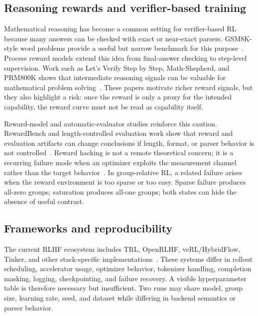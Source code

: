 \documentclass[runningheads,a4paper]{llncs}
\begin{document}
\subsection{Reasoning rewards and verifier-based training}

Mathematical reasoning has become a common setting for verifier-based RL
because many answers can be checked with exact or near-exact parsers.
GSM8K-style word problems provide a useful but narrow benchmark for this
purpose~\cite{cobbe2021training}. Process reward models extend this idea from
final-answer checking to step-level supervision. Work such as Let's Verify
Step by Step, Math-Shepherd, and PRM800K shows that intermediate reasoning
signals can be valuable for mathematical problem solving~\cite{lightman2024stepbystep,wang2024mathshepherd,uesato2022prm800k}. These papers motivate richer reward
signals, but they also highlight a risk: once the reward is only a proxy for
the intended capability, the reward curve must not be read as capability
itself.

Reward-model and automatic-evaluator studies reinforce this caution.
RewardBench and length-controlled evaluation work show that reward and
evaluation artifacts can change conclusions if length, format, or parser
behavior is not controlled~\cite{lambert2024rewardbench,dubois2024lengthcontrolled}.
Reward hacking is not a remote theoretical concern; it is a recurring failure
mode when an optimizer exploits the measurement channel rather than the target
behavior~\cite{skalse2022specificationgaming}. In group-relative RL, a related
failure arises when the reward environment is too sparse or too easy. Sparse
failure produces all-zero groups; saturation produces all-one groups; both
states can hide the absence of useful contrast.

\subsection{Frameworks and reproducibility}

The current RLHF ecosystem includes TRL, OpenRLHF, veRL/HybridFlow, Tinker, and
other stack-specific implementations~\cite{vonwerra2022trl,hu2024openrlhf,sheng2024verl,thinkingmachines2024tinker}. These systems differ in rollout
scheduling, accelerator usage, optimizer behavior, tokenizer handling,
completion masking, logging, checkpointing, and failure recovery. A visible
hyperparameter table is therefore necessary but insufficient. Two runs may
share model, group size, learning rate, seed, and dataset while differing in
backend semantics or parser behavior.
\end{document}
